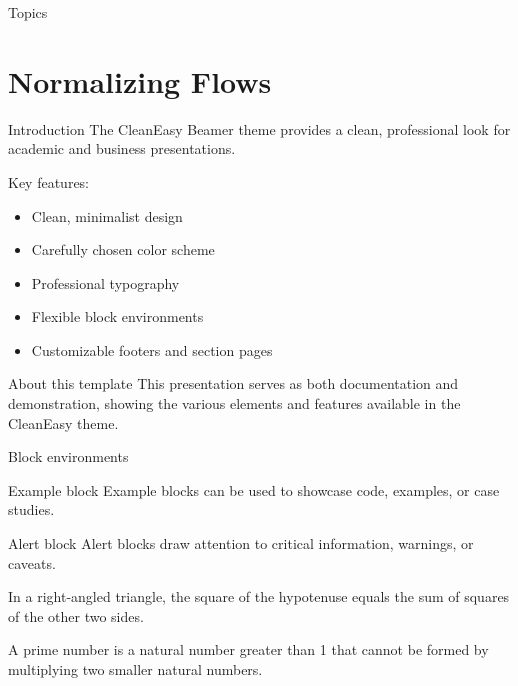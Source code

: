 \documentclass[aspectratio=169,xcolor=dvipsnames]{beamer}
\begin{document}
\begin{frame}[plain]
  \titlepage
\end{frame}

\begin{frame}[plain]{Topics}
  \tableofcontents
\end{frame}

\section{Normalizing Flows}
\begin{frame}{Introduction}
  The CleanEasy Beamer theme provides a clean, professional look for academic and business presentations.
  
  \vspace{0.3cm}
  
  Key features:
  \begin{itemize}
    \item Clean, minimalist design
    \item Carefully chosen color scheme
    \item Professional typography
    \item Flexible block environments
    \item Customizable footers and section pages
  \end{itemize}
  
  \begin{block}{About this template}
    This presentation serves as both documentation and demonstration, showing the various elements and features available in the CleanEasy theme.
  \end{block}
\end{frame}

\begin{frame}{Block environments}

  \begin{exampleblock}{Example block}
    Example blocks can be used to showcase code, examples, or case studies.
  \end{exampleblock}
  
  \begin{alertblock}{Alert block}
    Alert blocks draw attention to critical information, warnings, or caveats.
  \end{alertblock}
  
  \begin{theorem}
    In a right-angled triangle, the square of the hypotenuse equals the sum of squares of the other two sides.
  \end{theorem}
  
  \begin{definition}
    A prime number is a natural number greater than 1 that cannot be formed by multiplying two smaller natural numbers.
  \end{definition}
\end{frame}
\end{document}
